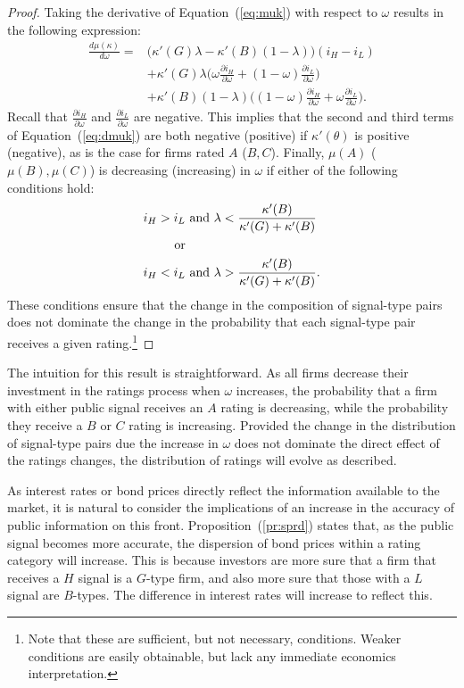 \documentclass[titlepage]{article}
\begin{document}
\begin{proof}
Taking the derivative of Equation~(\ref{eq:muk}) with respect to $\omega$ results in the following expression:
\begin{align}
\label{eq:dmuk}
\frac{d\mu(\kappa)}{d\omega}=&\bigg(\kappa'(G)\lambda-\kappa'(B)(1-\lambda)\bigg)(i_{H}-i_{L})\nonumber\\
&+\kappa'(G)\lambda\bigg(\omega\frac{\partial i_{H}}{\partial \omega}+(1-\omega)\frac{\partial i_{L}}{\partial \omega}\bigg)\nonumber\\
&+\kappa'(B)(1-\lambda)\bigg((1-\omega)\frac{\partial i_{H}}{\partial \omega}+\omega\frac{\partial i_{L}}{\partial \omega}\bigg).
\end{align}
Recall that $\frac{\partial i_{H}}{\partial \omega}$ and $\frac{\partial i_{L}}{\partial \omega}$ are negative. This implies that the second and third terms of Equation~(\ref{eq:dmuk}) are both negative (positive) if $\kappa'(\theta)$ is positive (negative), as is the case for firms rated $A$ ($B,C$). Finally, $\mu(A)$ ($\mu(B),\mu(C)$) is decreasing (increasing) in $\omega$ if either of the following conditions hold:
\begin{align*}
i_{H}>i_{L} & \textup{ and }\lambda<\frac{\kappa'(B)}{\kappa'(G)+\kappa'(B)}\\
\textup{or} & \\
i_{H}<i_{L} & \textup{ and }\lambda>\frac{\kappa'(B)}{\kappa'(G)+\kappa'(B)}.
\end{align*}
These conditions ensure that the change in the composition of signal-type pairs does not dominate the change in the probability that each signal-type pair receives a given rating.\footnote{Note that these are sufficient, but not necessary, conditions. Weaker conditions are easily obtainable, but lack any immediate economics interpretation.}
\end{proof}

The intuition for this result is straightforward. As all firms decrease their investment in the ratings process when $\omega$ increases, the probability that a firm with either public signal receives an $A$ rating is decreasing, while the probability they receive a $B$ or $C$ rating is increasing. Provided the change in the distribution of signal-type pairs due the increase in $\omega$ does not dominate the direct effect of the ratings changes, the distribution of ratings will evolve as described. 

As interest rates or bond prices directly reflect the information available to the market, it is natural to consider the implications of an increase in the accuracy of public information on this front. Proposition~(\ref{pr:sprd}) states that, as the public signal becomes more accurate, the dispersion of bond prices within a rating category will increase. This is because investors are more sure that a firm that receives a $H$ signal is a $G$-type firm, and also more sure that those with a $L$ signal are $B$-types. The difference in interest rates will increase to reflect this.
\end{document}
